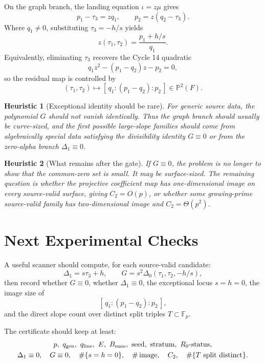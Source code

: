 \documentclass[11pt]{article}
\newtheorem{heuristic}{Heuristic}
\newcommand{\F}{\mathbb F}
\newcommand{\Bnum}{B_{\rm num}}
\newcommand{\Deltaone}{\Delta_1}
\newcommand{\Deltazero}{\Delta_0}
\newcommand{\tauone}{\tau_1}
\newcommand{\tautwo}{\tau_2}
\newcommand{\tauthree}{\tau_3}
\newcommand{\Ctwo}{C_2}
\newcommand{\qline}{q_{\rm line}}
\newcommand{\qgen}{q_{\rm gen}}
\begin{document}
On the graph branch, the landing equation \(\iota=z\mu\) gives
\[
  p_1-\tauthree=zq_1,\qquad p_2=z(q_2-\tauthree).
\]
Where \(q_1\ne0\), substituting \(\tauthree=-h/s\) yields
\[
  z(\tauone,\tautwo)=\frac{p_1+h/s}{q_1}.
\]
Equivalently, eliminating \(\tauthree\) recovers the Cycle 14 quadratic
\[
  q_1z^2-(p_1-q_2)z-p_2=0,
\]
so the residual map is controlled by
\[
  (\tauone,\tautwo)\longmapsto [\,q_1:(p_1-q_2):p_2\,]\in\mathbb P^2(F).
\]

\begin{heuristic}[Exceptional identity should be rare]
For generic source data, the polynomial \(G\) should not vanish identically.
Thus the graph branch should usually be curve-sized, and the first possible
large-slope families should come from algebraically special data satisfying
the divisibility identity \(G\equiv0\) or from the zero-alpha branch
\(\Deltaone\equiv0\).
\end{heuristic}

\begin{heuristic}[What remains after the gate]
If \(G\equiv0\), the problem is no longer to show that the common-zero set is
small.  It may be surface-sized.  The remaining question is whether the
projective coefficient map has one-dimensional image on every source-valid
surface, giving \(\Ctwo=O(p)\), or whether some growing-prime source-valid
family has two-dimensional image and \(\Ctwo=\Theta(p^2)\).
\end{heuristic}

\section{Next Experimental Checks}

A useful scanner should compute, for each source-valid candidate:
\[
  \Deltaone=s\tauthree+h,\qquad
  G=s^2\Deltazero(\tauone,\tautwo,-h/s),
\]
then record whether \(G\equiv0\), whether \(\Deltaone\equiv0\), the
exceptional locus \(s=h=0\), the image size of
\[
  [\,q_1:(p_1-q_2):p_2\,],
\]
and the direct slope count over distinct split triples \(T\subset\F_p\).

The certificate should keep at least:
\[
\begin{gathered}
  p,\ \qgen,\ \qline,\ E,\ \Bnum,\ \text{seed},\ \text{stratum},\
  R_0\text{-status},\\
  \Deltaone\equiv0,\quad G\equiv0,\quad
  \#\{s=h=0\},\quad \#\operatorname{image},\quad
  \Ctwo,\quad \#\{T\text{ split distinct}\}.
\end{gathered}
\]
\end{document}

